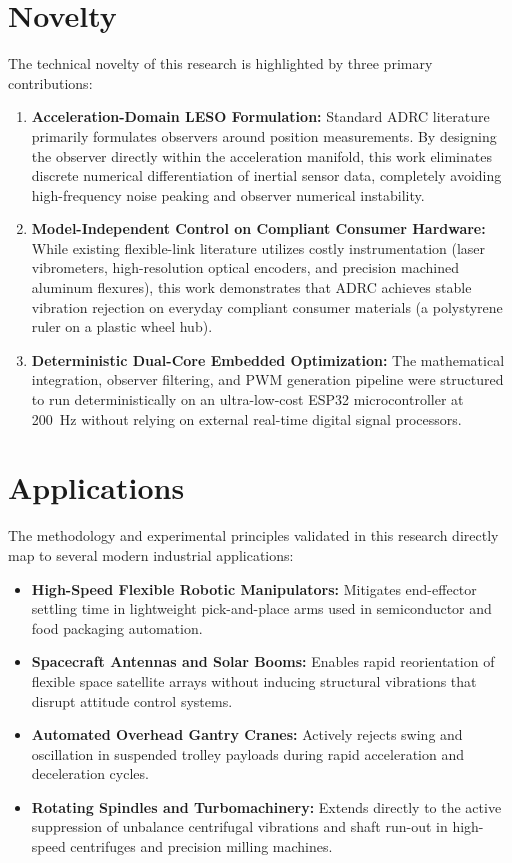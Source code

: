 \documentclass[conference]{IEEEtran}
\begin{document}
\section{Novelty}
The technical novelty of this research is highlighted by three primary contributions:
\begin{enumerate}
    \item \textbf{Acceleration-Domain LESO Formulation:} Standard ADRC literature primarily formulates observers around position measurements. By designing the observer directly within the acceleration manifold, this work eliminates discrete numerical differentiation of inertial sensor data, completely avoiding high-frequency noise peaking and observer numerical instability.
    \item \textbf{Model-Independent Control on Compliant Consumer Hardware:} While existing flexible-link literature utilizes costly instrumentation (laser vibrometers, high-resolution optical encoders, and precision machined aluminum flexures), this work demonstrates that ADRC achieves stable vibration rejection on everyday compliant consumer materials (a polystyrene ruler on a plastic wheel hub).
    \item \textbf{Deterministic Dual-Core Embedded Optimization:} The mathematical integration, observer filtering, and PWM generation pipeline were structured to run deterministically on an ultra-low-cost ESP32 microcontroller at 200~Hz without relying on external real-time digital signal processors.
\end{enumerate}

\section{Applications}
The methodology and experimental principles validated in this research directly map to several modern industrial applications:
\begin{itemize}
    \item \textbf{High-Speed Flexible Robotic Manipulators:} Mitigates end-effector settling time in lightweight pick-and-place arms used in semiconductor and food packaging automation.
    \item \textbf{Spacecraft Antennas and Solar Booms:} Enables rapid reorientation of flexible space satellite arrays without inducing structural vibrations that disrupt attitude control systems.
    \item \textbf{Automated Overhead Gantry Cranes:} Actively rejects swing and oscillation in suspended trolley payloads during rapid acceleration and deceleration cycles.
    \item \textbf{Rotating Spindles and Turbomachinery:} Extends directly to the active suppression of unbalance centrifugal vibrations and shaft run-out in high-speed centrifuges and precision milling machines.
\end{itemize}
\end{document}
